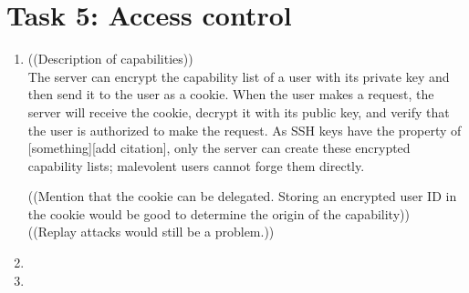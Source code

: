 \section*{Task 5: Access control}
\begin{enumerate}
\item %
  ((Description of capabilities))\\
  The server can encrypt the capability list of a user with its private key and then send it to the user as a cookie. When the user makes a request, the server will receive the cookie, decrypt it with its public key, and verify that the user is authorized to make the request. As SSH keys have the property of [something][add citation], only the server can create these encrypted capability lists; malevolent users cannot forge them directly.

((Mention that the cookie can be delegated. Storing an encrypted user ID in the cookie would be good to determine the origin of the capability))\\
((Replay attacks would still be a problem.))\\
\item %
\item \highergradesonly
\end{enumerate}
